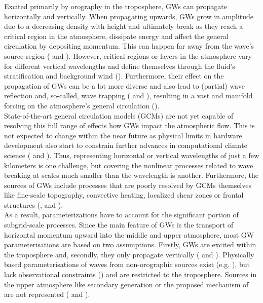 Excited primarily by orography in the troposphere, GWs can propagate horizontally and vertically. When propagating upwards, GWs grow in amplitude due to a decreasing density with height and ultimately break as they reach a critical region in the atmosphere, dissipate energy and affect the general circulation by depositing momentum. This can happen far away from the wave's source region (\cite{teixeira_physics_2014} and \cite{eliassen_transfer_1960}). However, critical regions or layers in the atmosphere vary for different vertical wavelengths and define themselves through the fluid's stratification and background wind (\cite{teixeira_physics_2014}). Furthermore, their effect on the propagation of GWs can be a lot more diverse and also lead to (partial) wave reflection and, so-called, wave trapping (\cite{fritts_gravity_2018} and \cite{scorer_theory_1949}), resulting in a vast and manifold forcing on the atmosphere's general circulation (\cite{alexander_recent_2010}). \\
State-of-the-art general circulation models (GCMs) are not yet capable of resolving this full range of effects how GWs impact the atmospheric flow. This is not expected to change within the near future as physical limits in hardware development also start to constrain further advances in computational climate science (\cite{balaji_climbing_2021} and \cite{balaji_climate_2015}). Thus, representing horizontal or vertical wavelengths of just a few kilometers is one challenge, but covering the nonlinear processes related to wave breaking at scales much smaller than the wavelength is another. Furthermore, the sources of GWs include processes that are poorly resolved by GCMs themselves like fine-scale topography, convective heating, localized shear zones or frontal structures (\cite{medvedev_gravity_2019}, \cite{fritts_gravity_2003} and \cite{plougonven_internal_2014}). \\
As a result, parameterizations have to account for the significant portion of subgrid-scale processes. Since the main feature of GWs is the transport of horizontal momentum upward into the middle and upper atmosphere, most GW parameterisations are based on two assumptions. Firstly, GWs are excited within the troposphere and, secondly, they only propagate vertically (\cite{plougonven_how_2020} and \cite{alexander_recent_2010}). Physically based parameterisations of waves from non-orographic sources exist (e.g. \cite{scinocca_accurate_2003}), but lack observational constraints (\cite{plougonven_internal_2014}) and are restricted to the troposphere. Sources in the upper atmosphere like secondary generation or the proposed mechanism of \textcite{dornbrack_stratospheric_2022} are not represented (\cite{plougonven_how_2020} and \cite{kim_overview_2003}). \\
